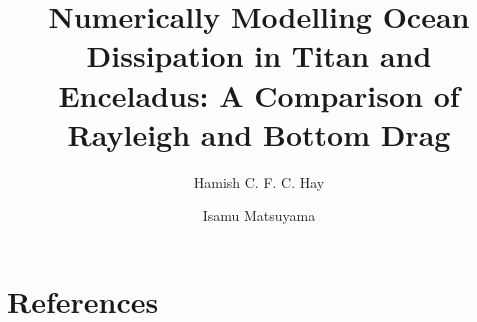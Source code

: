 \documentclass[preprint,3p,twocolumn,times,authoryear]{elsarticle}
\begin{document}
\hypersetup{
     allcolors = MidnightBlue
}

\begin{frontmatter}

\title{Numerically Modelling Ocean Dissipation in Titan and Enceladus: A Comparison of Rayleigh and Bottom Drag}

\author[label1]{Hamish C. F. C. Hay}
\author[label1]{Isamu Matsuyama}
\address[label1]{Lunar and Planetary Laboratory, University of Arizona, Tucson, AZ 85719, United States}

\begin{abstract}



\end{abstract}
\end{frontmatter}








%



\section*{References}



\end{document}
